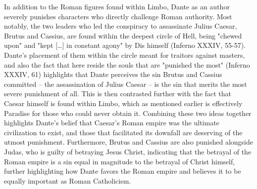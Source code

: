 \documentclass[12pt]{article}
\begin{document}
	In addition to the Roman figures found within Limbo, Dante as an author severely punishes characters who directly challenge 
	Roman authority. Most notably, the two leaders who led the conspiracy to assassinate Julius Caesar, Brutus and Cassius, are 
	found within the deepest circle of Hell, being "chewed upon" and "kept [\dots] in constant agony" by Dis himself (Inferno 
	XXXIV, 55-57). Dante's placement of them within the circle meant for traitors against masters, and also the fact that here 
	reside the souls that are "punished the most" (Inferno XXXIV, 61) highlights that Dante perceives the sin Brutus and Cassius 
	committed -- the assassination of Julius Caesar -- is the sin that merits the most severe punishment of all. This is 
	then contrasted further with the fact that Caesar himself is found within Limbo, which as mentioned earlier is effectively 
	Paradise for those who could never obtain it. Combining these two ideas together 
	highlights Dante's belief that Caesar's Roman empire was the ultimate civilization to exist, and those that facilitated
	its downfall are deserving of the utmost punishment. Furthermore, Brutus and Cassius are also punished alongside Judas, who is
	guilty of betraying Jesus Christ, indicating that the betrayal of the Roman empire is a sin equal 
	in magnitude to the betrayal of Christ himself, further highlighting how Dante favors the Roman empire and believes it to be 
	equally important as Roman Catholicism. 
	
\end{document}
